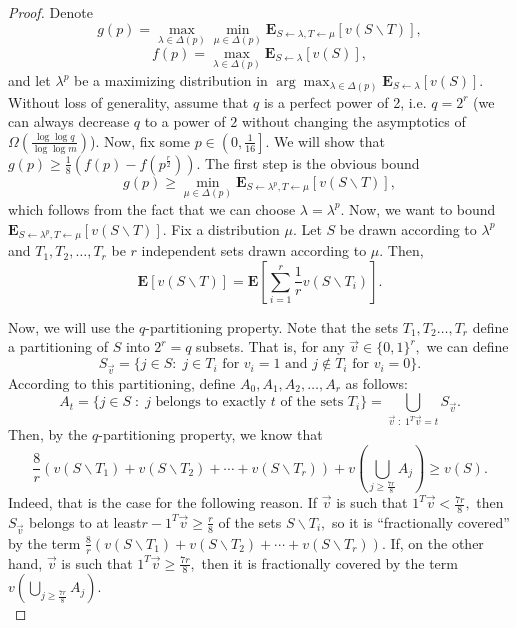 \documentclass[11pt]{article}\usepackage{amsfonts}
\numberwithin{theorem}{subsection}
\newcommand{\expect}{\mathbf{E}}
\begin{document}
\begin{proof} Denote 
$$
g(p) = \max_{\lambda\in \Delta(p)}
\min_{\mu \in \Delta(p)}\expect_{S\leftarrow \lambda, T\leftarrow \mu}[v(S\backslash T)],
$$
$$
f(p) = 
\max_{\lambda\in \Delta(p)}
\expect_{S\leftarrow \lambda}[v(S)],
$$
and let $\lambda^p$ be a maximizing distribution in 
$\arg \max_{\lambda\in \Delta(p)}
\expect_{S\leftarrow \lambda}[v(S)].$\\

\noindent
Without loss of generality, assume that $q$ is a perfect power of 2, i.e. $q = 2^r$ (we can always decrease $q$ to a power of $2$ without changing the asymptotics of $\Omega(\frac{\log \log q}{\log \log m})$). 
Now, fix some $p\in \left(0,\frac{1}{16}\right].$ We will show that $
g(p)\ge \frac{1}{8}\left(f(p) -f(p^{\frac{r}{2}}) \right).$
The first step is the obvious bound 
$$
g(p)\ge \min_{\mu \in \Delta(p)}\expect_{S\leftarrow \lambda^p, T\leftarrow \mu}[v(S\backslash T)],
$$
which follows from the fact that we can choose $\lambda = \lambda^p.$
Now, we want to bound $\expect_{S\leftarrow \lambda^p, T\leftarrow \mu}[v(S\backslash T)].$ Fix a distribution $\mu.$ Let $S$ be drawn according to $\lambda^p$ and $T_1, T_2, \ldots, T_r$ be $r$ independent sets drawn according to $\mu.$ Then,
$$
\expect[v(S\backslash T)] = 
\expect\left[
\sum_{i = 1}^r\frac{1}{r}v(S\backslash T_i)
\right].
$$

\noindent
Now, we will use the $q$-partitioning property. Note that the sets $T_1, T_2 \ldots, T_r$ define a partitioning of $S$ into $2^r = q$  subsets. That is, for any $\vec{v}\in \{0,1\}^r,$ we can define 
\begin{equation}
\tag{Partitioning with $r$ sets}
\label{eq:partwithrsets}
S_{\vec{v}} = \{j\in S: \; j \in T_i \text{ for }v_i = 1 \text{ and }j \not \in T_i \text{ for }v_i =0\}. 
\end{equation}
According to this partitioning, define $A_0, A_1, A_2, \ldots, A_r$ as follows:
$$
A_t = \{j \in S\; : \; j \text{ belongs to exactly }t \text{ of the sets }T_i\}
 = \bigcup_{\vec{v}\; :\; 1^T\vec{v} = t}S_{\vec{v}}.
$$
Then, by the $q$-partitioning property, we know that 
$$
\frac{8}{r}\left(
v(S\backslash T_1) + v(S\backslash T_2) + \cdots + 
v(S\backslash T_r)
\right) + 
v(\bigcup_{j \ge \frac{7r}{8}}A_j)\ge v(S).
$$
Indeed, that is the case for the following reason. If $\vec{v}$ is such that $1^T\vec{v}< \frac{7r}{8},$ then $S_{\vec{v}}$ belongs to at least\linebreak $r - 1^T\vec{v}\ge \frac{r}{8}$ of the sets $S\backslash T_i,$ so it is ``fractionally covered'' by the term\linebreak
$\frac{8}{r}\left(
v(S\backslash T_1) + v(S\backslash T_2) + \cdots + 
v(S\backslash T_r)\right).$ 
If, on the other hand, $\vec{v}$ is such that $1^T\vec{v}\ge \frac{7r}{8},$ then it is fractionally covered by the term $v(\bigcup_{j \ge \frac{7r}{8}}A_j).$\\


\end{proof}
\end{document}
